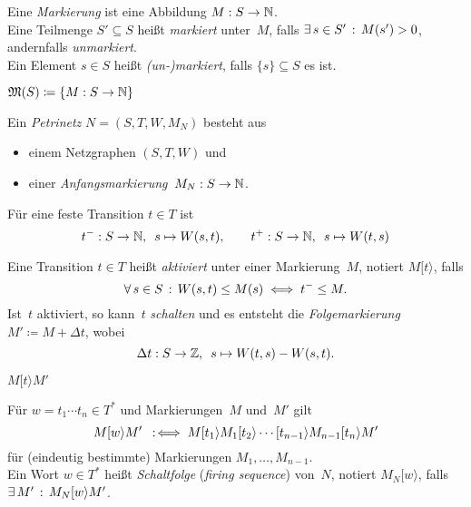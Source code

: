 \documentclass{cheat-sheet}
\newcommand{\activeTransition}[1]{[{#1}\rangle} %
\newcommand{\Markings}{\mathfrak{M}} %
\begin{document}
\begin{defn}
  Eine \emph{Markierung} ist eine Abbildung $M : S \to \mathbb{N}$. \\
  Eine Teilmenge $S' \subseteq S$ heißt \emph{markiert} unter~$M$, falls $\exists \, {s \in S'} \,:\, M(s') > 0$, andernfalls \textit{unmarkiert}. \\
  Ein Element $s \in S$ heißt \textit{(un-)markiert}, falls $\{ s \} \subseteq S$ es ist.
\end{defn}

\begin{nota}
  $\Markings(S) \coloneqq \{ M : S \to \N \}$
\end{nota}

\begin{defn}
  Ein \emph{Petrinetz} $N = (S, T, W, M_N)$ besteht aus
  \begin{itemize}
    \item einem Netzgraphen $(S, T, W)$ und
    \item einer \textit{Anfangsmarkierung}~$M_N : S \to \mathbb{N}$.
  \end{itemize}
\end{defn}

\begin{nota}
  Für eine feste Transition $t \in T$ ist
  \[
    t^{-} : S \to \mathbb{N}, \enspace s \mapsto W(s, t), \qquad
    t^{+} : S \to \mathbb{N}, \enspace s \mapsto W(t, s)
  \]
\end{nota}

\begin{defn}
  Eine Transition $t \in T$ heißt \emph{aktiviert} unter einer Markierung~$M$, notiert $M \activeTransition{t}$, falls
  \[
    \forall \, {s \in S} \,:\, W(s, t) \leq M(s) \iff
    t^{-} \leq M.
  \]
  Ist~$t$ aktiviert, so kann~$t$ \textit{schalten} und es entsteht die \textit{Folgemarkierung} $M' \coloneqq M + \Delta t$, wobei
  \[
    \Delta t : S \to \mathbb{Z}, \enspace s \mapsto W(t, s) - W(s, t).
  \]
\end{defn}

\begin{nota}
  $M \activeTransition{t} M'$
\end{nota}

\begin{defn}
  Für $w = t_1 \cdots t_n \in T^{*}$ und Markierungen~$M$ und~$M'$ gilt
  \[ M \activeTransition{w} M' \coloniff M \activeTransition{t_1} M_1 \activeTransition{t_2} \cdots \activeTransition{t_{n-1}} M_{n-1} \activeTransition{t_n} M' \]
  für (eindeutig bestimmte) Markierungen $M_1, \ldots, M_{n-1}$. \\
  Ein Wort $w \in T^{*}$ heißt \emph{Schaltfolge} (\textit{firing sequence}) von~$N$, notiert $M_N \activeTransition{w}$, falls $\ex{M'} M_N \activeTransition{w} M'$.
\end{defn}
\end{document}
